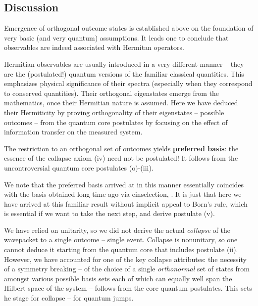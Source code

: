 \documentclass[aps,amsmath,amssymb,amsfonts,floatfix]{revtex4-1}
\newcommand{\+}         {\dagger}
\begin{document}
{\subsection{Discussion}

Emergence of orthogonal outcome states is established above on the
foundation of very basic (and very quantum) assumptions. It leads one to conclude that observables are indeed associated with Hermitan operators. 

Hermitian observables are usually introduced in a very different manner -- they are the (postulated!) quantum versions of the familiar classical quantities. This emphasizes physical significance of their spectra (especially when they correspond to conserved quantities). Their orthogonal eigenstates emerge from the mathematics, once their Hermitian nature is assumed. Here we have deduced their Hermiticity by proving orthogonality of their eigenstates -- possible outcomes -- from the quantum core postulates by focusing on the effect of information transfer on the measured system.

The restriction to an orthogonal set of outcomes yields {\bf preferred basis}:
the essence of the collapse axiom (iv) need not be postulated! It follows from the
uncontroversial quantum core postulates (o)-(iii). 

We note that the preferred basis arrived at in this manner essentially coincides with
the basis obtained long time ago via einselection, \cite{69,70}. It is just that here we have arrived at this
familiar result without implicit appeal to Born's rule, which is essential if we want to take the next step,
and derive postulate (v).

We have relied on unitarity, so we did not derive the actual {\it collapse} of the wavepacket to a single outcome -- single event. Collapse 
is nonunitary, so one cannot deduce it starting from the quantum core that includes postulate (ii). However, we have accounted for one of the key collapse attributes:
the necessity of a symmetry breaking -- of the choice of a single {\it orthonormal} set of states from amongst various possible basis sets each of which can equally
well span the Hilbert space of the system -- follows from the core quantum postulates. This sets he stage for collapse -- for quantum jumps.

}
\end{document}
